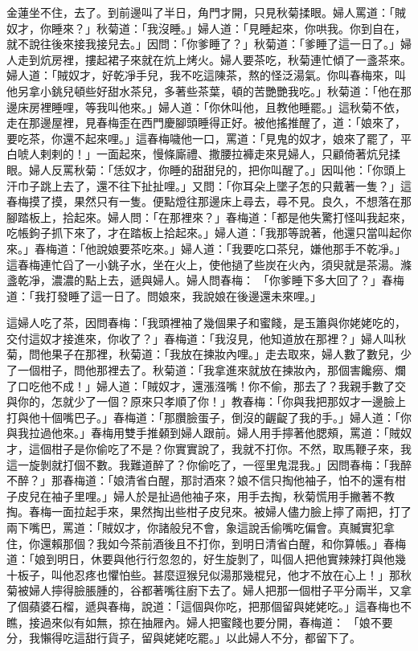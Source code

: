 金蓮坐不住，去了。到前邊叫了半日，角門才開，只見秋菊揉眼。婦人罵道：「賊奴才，你睡來？」秋菊道：「我沒睡。」婦人道：「見睡起來，你哄我。你到自在，就不說往後來接我接兒去。」因問：「你爹睡了？」秋菊道：「爹睡了這一日了。」婦人走到炕房裡，摟起裙子來就在炕上烤火。婦人要茶吃，秋菊連忙傾了一盞茶來。婦人道：「賊奴才，好乾凈手兒，我不吃這陳茶，熬的怪泛湯氣。你叫春梅來，叫他另拿小銚兒頓些好甜水茶兒，多著些茶葉，頓的苦艷艷我吃。」秋菊道：「他在那邊床房裡睡哩，等我叫他來。」婦人道：「你休叫他，且教他睡罷。」這秋菊不依，走在那邊屋裡，見春梅歪在西門慶腳頭睡得正好。被他搖推醒了，道：「娘來了，要吃茶，你還不起來哩。」這春梅噦他一口，罵道：「見鬼的奴才，娘來了罷了，平白唬人剌剌的！」一面起來，慢條廝禮、撒腰拉褲走來見婦人，只顧倚著炕兒揉眼。婦人反罵秋菊：「恁奴才，你睡的甜甜兒的，把你叫醒了。」因叫他：「你頭上汗巾子跳上去了，還不往下扯扯哩。」又問：「你耳朵上墜子怎的只戴著一隻？」這春梅摸了摸，果然只有一隻。便點燈往那邊床上尋去，尋不見。良久，不想落在那腳踏板上，拾起來。婦人問：「在那裡來？」春梅道：「都是他失驚打怪叫我起來，吃帳鉤子抓下來了，才在踏板上拾起來。」婦人道：「我那等說著，他還只當叫起你來。」春梅道：「他說娘要茶吃來。」婦人道：「我要吃口茶兒，嫌他那手不乾凈。」這春梅連忙舀了一小銚子水，坐在火上，使他撾了些炭在火內，須臾就是茶湯。滌盞乾凈，濃濃的點上去，遞與婦人。婦人問春梅： 「你爹睡下多大回了？」春梅道：「我打發睡了這一日了。問娘來，我說娘在後邊還未來哩。」

這婦人吃了茶，因問春梅：「我頭裡袖了幾個果子和蜜餞，是玉簫與你姥姥吃的，交付這奴才接進來，你收了？」春梅道：「我沒見，他知道放在那裡？」婦人叫秋菊，問他果子在那裡，秋菊道：「我放在揀妝內哩。」走去取來，婦人數了數兒，少了一個柑子，問他那裡去了。秋菊道：「我拿進來就放在揀妝內，那個害饞癆、爛了口吃他不成！」婦人道：「賊奴才，還漲漒嘴！你不偷，那去了？我親手數了交與你的，怎就少了一個？原來只孝順了你！」教春梅：「你與我把那奴才一邊臉上打與他十個嘴巴子。」春梅道：「那臢臉蛋子，倒沒的齷齪了我的手。」婦人道：「你與我拉過他來。」春梅用雙手推顙到婦人跟前。婦人用手擰著他腮頰，罵道：「賊奴才，這個柑子是你偷吃了不是？你實實說了，我就不打你。不然，取馬鞭子來，我這一旋剝就打個不數。我難道醉了？你偷吃了，一徑里鬼混我。」因問春梅：「我醉不醉？」那春梅道：「娘清省白醒，那討酒來？娘不信只掏他袖子，怕不的還有柑子皮兒在袖子里哩。」婦人於是扯過他袖子來，用手去掏，秋菊慌用手撇著不教掏。春梅一面拉起手來，果然掏出些柑子皮兒來。被婦人儘力臉上擰了兩把，打了兩下嘴巴，罵道：「賊奴才，你諸般兒不會，象這說舌偷嘴吃偏會。真贓實犯拿住，你還賴那個？我如今茶前酒後且不打你，到明日清省白醒，和你算帳。」春梅道：「娘到明日，休要與他行行忽忽的，好生旋剝了，叫個人把他實辣辣打與他幾十板子，叫他忍疼也懼怕些。甚麼逗猴兒似湯那幾棍兒，他才不放在心上！」那秋菊被婦人擰得臉脹腫的，谷都著嘴往廚下去了。婦人把那一個柑子平分兩半，又拿了個蘋婆石榴，遞與春梅，說道：「這個與你吃，把那個留與姥姥吃。」這春梅也不瞧，接過來似有如無，掠在抽屜內。婦人把蜜餞也要分開，春梅道： 「娘不要分，我懶得吃這甜行貨子，留與姥姥吃罷。」以此婦人不分，都留下了。


